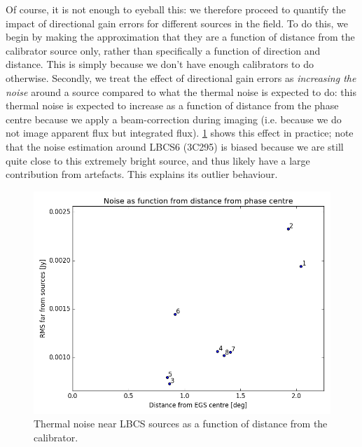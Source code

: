 \pg
Of course, it is not enough to eyeball this: we therefore proceed to quantify the impact of directional gain errors for different sources in the field. To do this, we begin by making the approximation that they are a function of distance from the calibrator source only, rather than specifically a function of direction and distance. This is simply because we don't have enough calibrators to do otherwise. Secondly, we treat the effect of directional gain errors as \textit{increasing the noise} around a source compared to what the thermal noise is expected to do: this thermal noise is expected to increase as a function of distance from the phase centre because we apply a beam-correction during imaging (i.e. because we do not image apparent flux but integrated flux). \cref{fig.noiserms.distEGS} shows this effect in practice; note that the noise estimation around LBCS6 (3C295) is biased because we are still quite close to this extremely bright source, and thus likely have a large contribution from artefacts. This explains its outlier behaviour.
\begin{figure}[h!]
\includegraphics[width=0.8\linewidth]{images/RMSvsDistFromEGS.png}
\caption{Thermal noise near LBCS sources as a function of distance from the calibrator.}
\label{fig.noiserms.distEGS}
\end{figure}

